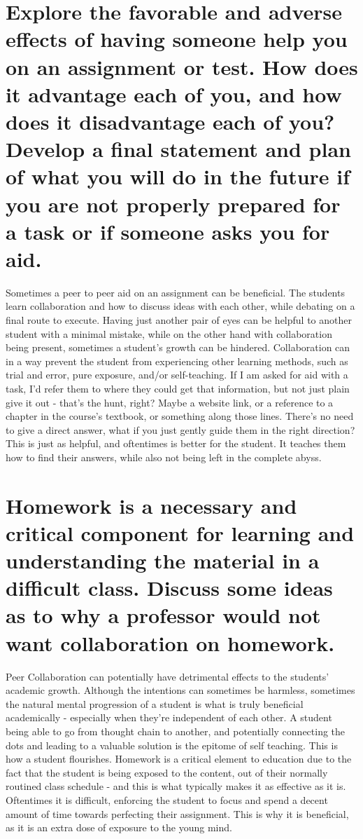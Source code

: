 \documentclass[12pt]{article} %
\begin{document}
\section{ Explore the favorable and adverse effects of having someone help you on an assignment or test. How does it advantage each of you, and how does it disadvantage each of you? Develop a final statement and plan of what you will do in the future if you are not properly prepared for a task or if someone asks you for aid.}
\tab
Sometimes a peer to peer aid on an assignment can be beneficial. The students learn collaboration and how to discuss ideas with each other, while debating on a final route to execute. Having just another pair of eyes can be helpful to another student with a minimal mistake, while on the other hand with collaboration being present, sometimes a student's growth can be hindered. Collaboration can in a way prevent the student from experiencing other learning methods, such as trial and error, pure exposure, and/or self-teaching. If I am asked for aid with a task, I’d refer them to where they could get that information, but not just plain give it out - that’s the hunt, right? Maybe a website link, or a reference to a chapter in the course's textbook, or something along those lines. There’s no need to give a direct answer, what if you just gently guide them in the right direction? This is just as helpful, and oftentimes is better for the student. It teaches them how to find their answers, while also not being left in the complete abyss. 


\section{Homework is a necessary and critical component for learning and understanding the material in a difficult class. Discuss some ideas as to why a professor would not want collaboration on homework.}
\tab
Peer Collaboration can potentially have detrimental effects to the students’ academic growth. Although the intentions can sometimes be harmless, sometimes the natural mental progression of a student is what is truly beneficial academically - especially when they’re independent of each other. A student being able to go from thought chain to another, and potentially connecting the dots and leading to a valuable solution is the epitome of self teaching. This is how a student flourishes. Homework is a critical element to education due to the fact that the student is being exposed to the content, out of their normally routined class schedule - and this is what typically makes it as effective as it is. Oftentimes it is difficult, enforcing the student to focus and spend a decent amount of time towards perfecting their assignment. This is why it is beneficial, as it is an extra dose of exposure to the young mind. 
\end{document}
